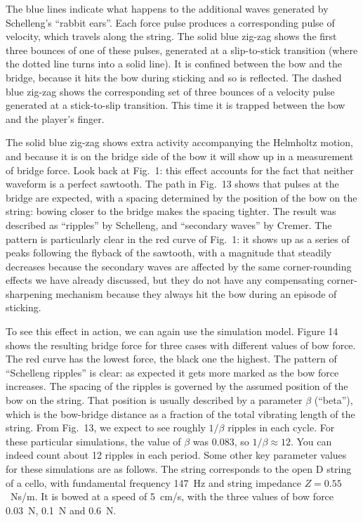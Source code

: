   The blue lines indicate what happens to the additional waves generated by 
  Schelleng’s “rabbit ears”. Each force pulse produces a corresponding pulse of 
  velocity, which travels along the string. The solid blue zig-zag shows the 
  first three bounces of one of these pulses, generated at a slip-to-stick 
  transition (where the dotted line turns into a solid line). It is confined 
  between the bow and the bridge, because it hits the bow during sticking and 
  so is reflected. The dashed blue zig-zag shows the corresponding set of three 
  bounces of a velocity pulse generated at a stick-to-slip transition. This 
  time it is trapped between the bow and the player’s finger. 

  The solid blue zig-zag shows extra activity accompanying the Helmholtz 
  motion, and because it is on the bridge side of the bow it will show up in a 
  measurement of bridge force. Look back at Fig.\ 1: this effect accounts for 
  the fact that neither waveform is a perfect sawtooth. The path in Fig.\ 13 
  shows that pulses at the bridge are expected, with a spacing determined by 
  the position of the bow on the string: bowing closer to the bridge makes the 
  spacing tighter. The result was described as ``ripples'' by Schelleng, and 
  ``secondary waves'' by Cremer. The pattern is particularly clear in the red 
  curve of Fig.\ 1: it shows up as a series of peaks following the flyback of 
  the sawtooth, with a magnitude that steadily decreases because the secondary 
  waves are affected by the same corner-rounding effects we have already 
  discussed, but they do not have any compensating corner-sharpening mechanism 
  because they always hit the bow during an episode of sticking. 

  To see this effect in action, we can again use the simulation model. Figure 
  14 shows the resulting bridge force for three cases with different values of 
  bow force. The red curve has the lowest force, the black one the highest. The 
  pattern of ``Schelleng ripples'' is clear: as expected it gets more marked as 
  the bow force increases. The spacing of the ripples is governed by the 
  assumed position of the bow on the string. That position is usually described 
  by a parameter $\beta$ (``beta''), which is the bow-bridge distance as a 
  fraction of the total vibrating length of the string. From Fig.\ 13, we 
  expect to see roughly $1/\beta$ ripples in each cycle. For these particular 
  simulations, the value of $\beta$ was 0.083, so $1/\beta \approx 12$. You can 
  indeed count about 12 ripples in each period. Some other key parameter values 
  for these simulations are as follows. The string corresponds to the open D 
  string of a cello, with fundamental frequency 147 Hz and string impedance 
  $Z=0.55$ Ns/m. It is bowed at a speed of 5 cm/s, with the three values of bow 
  force 0.03 N, 0.1 N and 0.6 N. 

